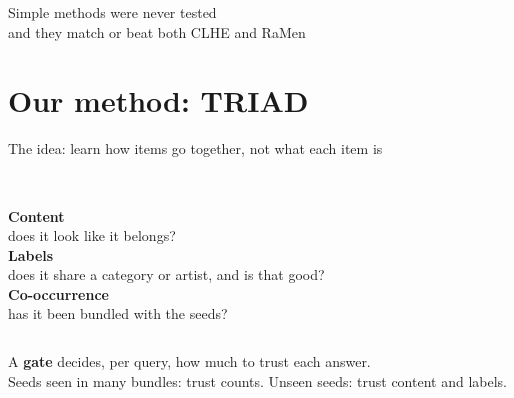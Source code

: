 \documentclass[aspectratio=169,11pt]{beamer}
\begin{document}

\begin{frame}[standout]
Simple methods were never tested\\[4pt]
and they match or beat both CLHE and RaMen
\end{frame}

\section{Our method: TRIAD}

\begin{frame}{The idea: learn how items go together, not what each item is}
\begin{columns}[T]
\centering
{\Huge\color{triad}\faEye}\\[4pt]
\textbf{Content}\\
\small does it look like it belongs?
\centering
{\Huge\color{triad}\faTags}\\[4pt]
\textbf{Labels}\\
\small does it share a category or artist, and is that good?
\centering
{\Huge\color{triad}\faProjectDiagram}\\[4pt]
\textbf{Co-occurrence}\\
\small has it been bundled with the seeds?
\end{columns}
\vfill
\begin{block}{}
\centering A \textbf{gate} decides, per query, how much to trust each answer.\\
Seeds seen in many bundles: trust counts. \quad Unseen seeds: trust content and labels.
\end{block}
\end{frame}
\end{document}

